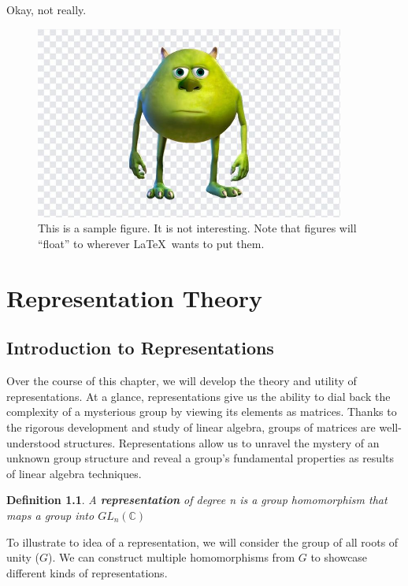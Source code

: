 \documentclass[10pt]{ucthesis}
\newtheorem{definition}{Definition}[chapter]
\begin{document}
Okay, not really.  



\begin{figure}[htbp] %
   \centering
   \includegraphics[width=4in]{meme.jpg} 
   \caption{This is a sample figure.  It is not interesting. Note that 
   figures will ``float'' to wherever \LaTeX \ wants to put them.  }
   \label{fig:example}
\end{figure}


\chapter{Representation Theory}

\section{Introduction to Representations}

Over the course of this chapter, we will develop the theory and utility of representations. At a glance, representations give us the ability to dial back the complexity of a mysterious group by viewing its elements as matrices. Thanks to the rigorous development and study of linear algebra, groups of matrices are well-understood structures. Representations allow us to unravel the mystery of an unknown group structure and reveal a group's fundamental properties as results of linear algebra techniques. 

\begin{definition}
	A \textbf{representation} of degree n is a group homomorphism that maps a group into $GL_n(\mathbb{C})$
\end{definition}

To illustrate to idea of a representation, we will consider the group of all roots of unity ($G$). We can construct multiple homomorphisms from $G$ to showcase different kinds of representations. 
\end{document}
